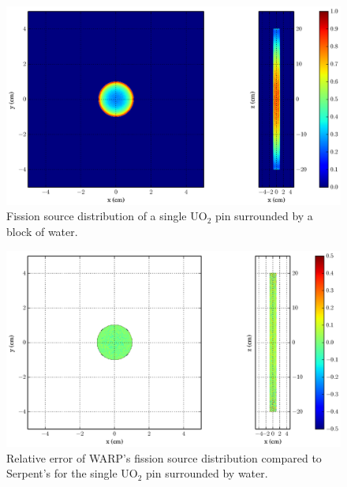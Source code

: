 \begin{figure}[h!]
\centering
\includegraphics[width=\textwidth,trim= 11cm 0cm 6cm 0cm]{graphics/finalresults/pincell_fiss-6.eps}
\caption{Fission source distribution of a single UO$_2$ pin surrounded by a block of water. \label{pincell_fiss} }
\end{figure}

\begin{figure}[h!]
\centering
\includegraphics[width=\textwidth,trim= 11cm 0cm 6cm 0cm]{graphics/finalresults/pincell_fiss_diff-6.eps}
\caption{Relative error of WARP's fission source distribution compared to Serpent's for the single UO$_2$ pin surrounded by water. \label{pincell_fiss_diff} }
\end{figure}

